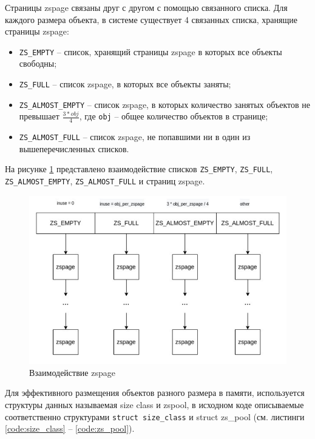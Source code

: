 Страницы zspage связаны друг с другом с помощью связанного списка. Для каждого размера объекта, в системе существует 4 связанных списка, хранящие страницы zspage:

\begin{itemize}
	\item \texttt{ZS\_EMPTY} -- список, хранящий страницы zspage в которых все объекты свободны;
	\item \texttt{ZS\_FULL} -- список zspage, в которых все объекты заняты;
	\item \texttt{ZS\_ALMOST\_EMPTY} -- список zspage, в которых количество занятых объектов не превышает $\frac{3 * obj}{4}$, где \texttt{obj} -- общее количество объектов в странице;
	\item \texttt{ZS\_ALMOST\_FULL} -- список zspage, не попавшими ни в один из вышеперечисленных списков.
\end{itemize}

На рисунке \ref{fig:fullness_group} представлено взаимодействие списков \texttt{ZS\_EMPTY}, \texttt{ZS\_FULL}, \texttt{ZS\_ALMOST\_EMPTY}, \texttt{ZS\_ALMOST\_FULL} и страниц zspage. 

\begin{figure}[h]
	\centering
	\includegraphics[width=\textwidth]{img/fullness_group.png}
	\caption{Взаимодействие zspage}
	\label{fig:fullness_group}
\end{figure}

Для эффективного размещения объектов разного размера в памяти, используется структуры данных называемая size class и zspool, в исходном коде описываемые соответственно структурами \texttt{struct size\_class} и {struct zs\_pool} (см. листинги \ref{code:size_class} -- \ref{code:zs_pool}).

